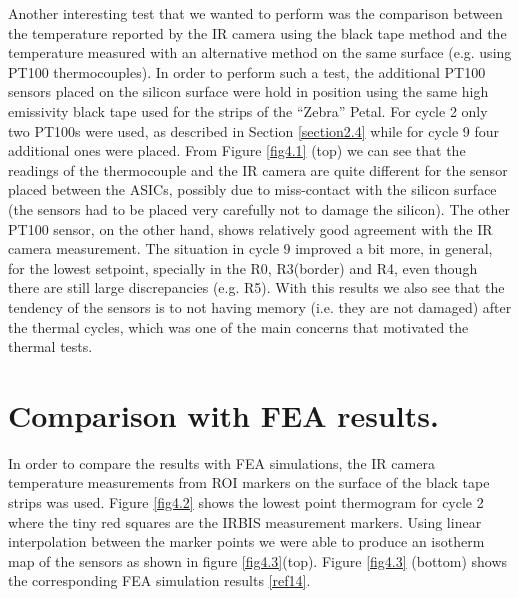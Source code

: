 		Another interesting test that we wanted to perform was the comparison between the temperature reported by the IR camera using the black tape method and the temperature measured with an alternative method on the same surface (e.g. using PT100 thermocouples). In order to perform such a test, the additional PT100 sensors placed on the silicon surface were hold in position using the same high emissivity black tape used for the strips of the “Zebra” Petal. For cycle 2 only two PT100s were used, as described in Section \ref{section2.4} while for cycle 9 four additional ones were placed. From Figure \ref{fig4.1} (top) we can see that the readings of the thermocouple and the IR camera are quite different for the sensor placed between the ASICs, possibly due to miss-contact with the silicon surface (the sensors had to be placed very carefully not to damage the silicon). The other PT100 sensor, on the other hand, shows relatively good agreement with the IR camera measurement. The situation in cycle 9 improved a bit more, in general, for the lowest setpoint, specially in the R0, R3(border) and R4, even though there are still large discrepancies (e.g. R5). With this results we also see that the tendency of the sensors is to not having memory (i.e. they are not damaged) after the thermal cycles, which was one of the main concerns that motivated the thermal tests.\bigskip
		
	\section{Comparison with FEA results.}\label{section4.2}	
	
		In order to compare the results with FEA simulations, the IR camera temperature measurements from ROI markers on the surface of the black tape strips was used. Figure \ref{fig4.2} shows the lowest point thermogram for cycle 2 where the tiny red squares are the IRBIS measurement markers. Using linear interpolation between the marker points we were able to produce an isotherm map of the sensors as shown in figure \ref{fig4.3}(top). Figure \ref{fig4.3} (bottom) shows the corresponding FEA simulation results \ref{ref14}.
		
